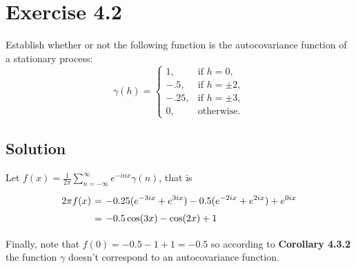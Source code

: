 \section*{Exercise 4.2}

Establish whether or not the following function is the autocovariance function 
of a stationary process:
\[
\gamma(h) = 
\begin{cases} 
1, & \text{if } h = 0, \\
-.5, & \text{if } h = \pm 2, \\
-.25, & \text{if } h = \pm 3, \\
0, & \text{otherwise}.
\end{cases}
\]

\subsection*{Solution}

Let $f(x) = \frac{1}{2\pi} \sum_{n = -\infty}^{\infty} e^{-in x} \gamma(n)$, that is
\[ \everymath{\displaystyle}
\arraycolsep=1.8pt\def\arraystretch{1.5}
\begin{array}{rcl}
    2\pi f(x) & = & -0.25 (e^{-3ix} + e^{3ix}) - 0.5(e^{-2ix} + e^{2ix}) + e^{0ix}\\
    & = & -0.5 \cos(3x) - \cos(2x) + 1
\end{array}\]

Finally, note that $f(0) =-0.5-1+1 = -0.5$ so according to \textbf{Corollary 4.3.2} the function $\gamma$ doesn't correspond to an autocovariance function. 